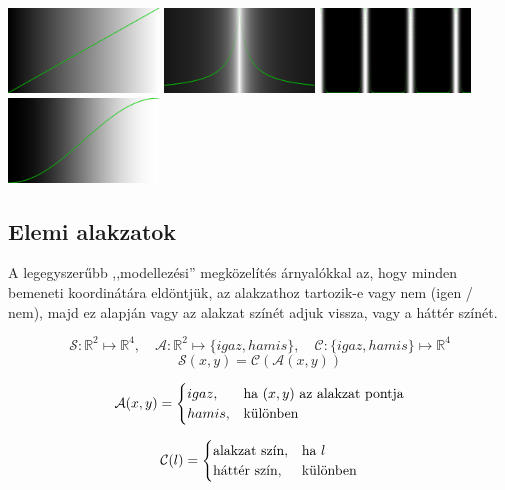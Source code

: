 \begin{center}
\includegraphics[width=4cm]{images/f01.png}\hfill
\includegraphics[width=4cm]{images/f02.png}\hfill
\includegraphics[width=4cm]{images/f03.png}\hfill
\includegraphics[width=4cm]{images/f04.png}
\end{center}

\subsection{Elemi alakzatok}

A legegyszerűbb ,,modellezési'' megközelítés árnyalókkal az, hogy minden bemeneti koordinátára
eldöntjük, az alakzathoz tartozik-e vagy nem (igen / nem), majd ez alapján vagy az
alakzat színét adjuk vissza, vagy a háttér színét.

\begin{tcolorbox}
  
  $$
  \mathcal{S}: \mathbb{R}^2 \mapsto \mathbb{R}^4,\quad
  \mathcal{A}: \mathbb{R}^2 \mapsto \{igaz, hamis\},\quad
  \mathcal{C}: \{igaz, hamis\} \mapsto \mathbb{R}^4
  $$
  $$\mathcal{S}(x, y) = \mathcal{C}(\mathcal{A}(x,y))$$

  $$\mathcal{A}(x,y) = 
    \begin{cases}
      igaz,  &\text{ha~} (x, y) \text{~az alakzat pontja}\cr
      hamis, &\text{különben}
    \end{cases}
  $$

  $$\mathcal{C}(l) = 
    \begin{cases}
      \text{alakzat szín},  &\text{ha~} l\cr
      \text{háttér szín}, &\text{különben}
    \end{cases}
  $$

  \end{tcolorbox}

